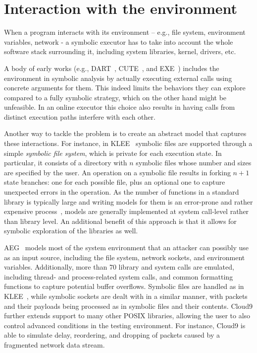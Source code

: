 \section{Interaction with the environment}

When a program interacts with its environment -- e.g., file system, environment variables, network - a symbolic executor has to take into account the whole software stack surrounding it, including system libraries, kernel, drivers, etc.

A body of early works (e.g., {\sc DART}~\cite{DART-PLDI05}, {\sc CUTE}~\cite{CUTE-FSE13}, and {\sc EXE}~\cite{EXE-CCS06}) includes the environment in symbolic analysis by actually executing external calls using concrete arguments for them. This indeed limits the behaviors they can explore compared to a fully symbolic strategy, which on the other hand might be unfeasible. In an online executor this choice also results in having calls from distinct execution paths interfere with each other. 

Another way to tackle the problem is to create an abstract model that captures these interactions. For instance, in {\sc KLEE}~\cite{KLEE-OSDI08} symbolic files are supported through a simple {\em symbolic file system}, which is private for each execution state. In particular, it consists of a directory with $n$ symbolic files whose number and sizes are specified by the user. An operation on a symbolic file results in forking $n+1$ state branches: one for each possible file, plus an optional one to capture unexpected errors in the operation. As the number of functions in a standard library is typically large and writing models for them is an error-prone and rather expensive process~\cite{Ball06}, models are generally implemented at system call-level rather than library level. An additional benefit of this approach is that it allows for symbolic exploration of the libraries as well.

{\sc AEG}~\cite{AEG-NDSS11} models most of the system environment that an attacker can possibly use as an input source, including the file system, network sockets, and environment variables. Additionally, more than 70 library and system calls are emulated, including thread- and process-related system calls, and common formatting functions to capture potential buffer overflows. Symbolic files are handled as in {\sc KLEE}~\cite{KLEE-OSDI08}, while symbolic sockets are dealt with in a similar manner, with packets and their payloads being processed as in symbolic files and their contents. {\sc Cloud9} further extends support to many other POSIX libraries, allowing the user to also control advanced conditions in the testing environment. For instance,  {\sc Cloud9} is able to simulate delay, reordering, and dropping of packets caused by a fragmented network data stream.

